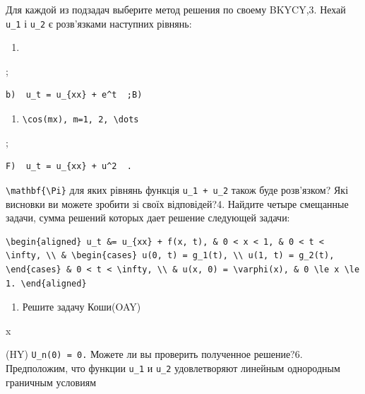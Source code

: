 \documentclass[
  ukrainian,
]{article}
\providecommand{\tightlist}{%
  \setlength{\itemsep}{0pt}\setlength{\parskip}{0pt}}
\begin{document}
Для каждой из подзадач выберите метод решения по своему BKYCY,3. Нехай
\texttt{u\_1} і \texttt{u\_2} є розв'язками наступних рівнянь:

\begin{enumerate}
\def\labelenumi{\alph{enumi})}
\tightlist
\item
\end{enumerate}

;

\begin{verbatim}
b)  u_t = u_{xx} + e^t  ;B)
\end{verbatim}

\begin{enumerate}
\def\labelenumi{\arabic{enumi}.}
\setcounter{enumi}{4}
\tightlist
\item
  \texttt{\textbackslash{}cos(mx),\ m=1,\ 2,\ \textbackslash{}dots}
\end{enumerate}

;

\begin{verbatim}
F)  u_t = u_{xx} + u^2  .
\end{verbatim}

\texttt{\textbackslash{}mathbf\{\textbackslash{}Pi\}} для яких рівнянь
функція \texttt{u\_1\ +\ u\_2} також буде розв'язком? Які висновки ви
можете зробити зі своїх відповідей?4. Найдите четыре смещанные задачи,
сумма решений которых дает решение следующей задачи:

\begin{verbatim}
\begin{aligned} u_t &= u_{xx} + f(x, t), & 0 < x < 1, & 0 < t < \infty, \\ & \begin{cases} u(0, t) = g_1(t), \\ u(1, t) = g_2(t), \end{cases} & 0 < t < \infty, \\ & u(x, 0) = \varphi(x), & 0 \le x \le 1. \end{aligned}
\end{verbatim}

\begin{enumerate}
\def\labelenumi{\arabic{enumi}.}
\setcounter{enumi}{4}
\tightlist
\item
  Решите задачу Коши(OAY)
\end{enumerate}

x

(HY) \texttt{U\_n(0)\ =\ 0.} Можете ли вы проверить полученное
решение?6. Предположим, что функции \texttt{u\_1} и \texttt{u\_2}
удовлетворяют линейным однородным граничным условиям
\end{document}
